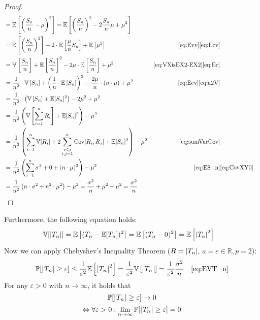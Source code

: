 \begin{proof}
\begin{align}
              &= \mathbb E\left[\left(\frac{S_n}{n} - \mu\right)^2\right] = \mathbb E\left[\left(\frac{S_n}{n}\right)^2 - 2\frac{S_n}{n}\mu + \mu^2\right] \notag \\
              &= \mathbb E\left[\left(\frac{S_n}{n}\right)^2\right] - 2\cdot\mathbb E\left[\frac{\mu}{n} S_n\right] + \mathbb E\left[\mu^2\right] & \eqref{eq:Evv}\eqref{eq:Ecv} \notag\\
              &= \mathbb V\left[\frac{S_n}{n}\right] + \mathbb E\left[\frac{S_n}{n}\right]^2 - 2\mu \cdot \mathbb E\left[\frac{S_n}{n}\right] + \mu^2 & \eqref{eq:VXisEX2-EX2}\eqref{eq:Ec} \notag \\
              &= \frac1{n^2} \cdot \mathbb V\left[S_n\right] + \left(\frac1{n} \cdot \mathbb E\left[S_n\right]\right)^2 - \frac{2\mu}{n} \cdot (n \cdot \mu) + \mu^2 & \eqref{eq:Ecv}\eqref{eq:a2V} \notag \\
              &= \frac1{n^2} \cdot \left(\mathbb V\left[S_n\right] + \mathbb E[S_n]^2\right) - 2\mu^2 + \mu^2 \notag \\
              &= \frac{1}{n^2} \left(\mathbb V\left[\sum_{i=1}^n R_i\right] + \mathbb E[S_n]^2\right) - \mu^2 \notag\\
              &= \frac{1}{n^2} \left(\sum_{i=1}^n \mathbb V[R_i] + 2\sum_{\substack{i<j \\ i,j=1}}^n \operatorname{Cov}[R_i,R_j] + \mathbb E[S_n]^2\right) - \mu^2 & \eqref{eq:sumVarCov} \notag\\
              &= \frac{1}{n^2} \left(\sum_{i=1}^n \sigma^2 + 0 + (n \cdot \mu)^2\right) - \mu^2 & \eqref{eq:ES_n} & \eqref{eq:CovXY0} \notag\\
              &= \frac{1}{n^2} \left(n \cdot \sigma^2 + n^2 \cdot \mu^2\right) - \mu^2 = \frac{\sigma^2}{n} + \mu^2 - \mu^2 = \frac{\sigma^2}{n}
  \end{align}
\end{proof}
%

Furthermore, the following equation holds:
\begin{align}
    \mathbb V[\left\lvert{T_n}\right\rvert] &= \mathbb E\left[(T_n - \mathbb E[T_n])^2\right] = \mathbb E\left[(T_n - 0)^2\right] = \mathbb E\left[\left\lvert{T_n}\right\rvert^2\right] \label{eq:EVT_n}
\end{align}
%
Now we can apply Chebyshev's Inequality Theorem ($R = \left\lvert{T_n}\right\rvert$, $a = \varepsilon \in \mathbb R, p = 2$):
\begin{align}
  \mathbb P[\left|\hspace{0.6999pt}T_n\hspace{0.6999pt}\right| \geq \varepsilon]
    &\leq \frac{1}{\varepsilon^2} \mathbb E\left[\left|\hspace{0.6999pt}T_n\hspace{0.6999pt}\right|^2\right]
    = \frac{1}{\varepsilon^2} \mathbb V\left[\left|\hspace{0.6999pt}T_n\hspace{0.6999pt}\right|\right]
    = \frac{1}{\varepsilon^2} \frac{\sigma^2}{n}
    & \eqref{eq:EVT_n} \label{eq:cheby-applied}
\end{align}
For any $\varepsilon > 0$ with $n \to \infty$, it holds that
\[ \mathbb P[\left|\hspace{0.6999pt}T_n\hspace{0.6999pt}\right| \geq \varepsilon] \to 0 \]
\[
    \Leftrightarrow \forall \varepsilon > 0:
    \lim_{n\to\infty} \mathbb P[\left|\hspace{0.6999pt}T_n\hspace{0.6999pt}\right| \geq \varepsilon] = 0
\]

